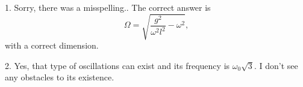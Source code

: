 \documentclass[14pt,a4paper,pdflatex]{disser}
\begin{document}

\pagebreak


\pagebreak

1. Sorry, there was a misspelling.. The correct answer is
$$
  \Omega=\sqrt{\frac{g^2}{\omega^2 l^2}-\omega^2},
$$
with a correct dimension.

2. Yes, that type of oscillations can exist and its frequency is $\omega_0 \sqrt{3}$. I don't see any obstacles to its existence.
\end{document}
